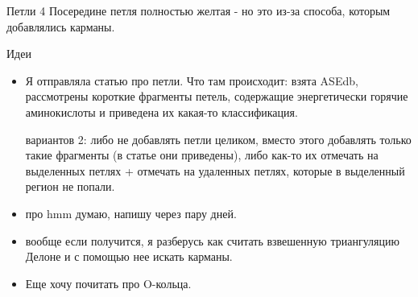 \documentclass[10pt, xcolor={dvipsnames}]{beamer}
\begin{document}
\begin{frame}{Петли 4}
Посередине петля полностью желтая - но это из-за способа, которым добавлялись карманы.
\begin{center}
\end{center}

\end{frame}

\begin{frame}{Идеи}
\begin{itemize}
\item Я отправляла статью про петли. Что там происходит: взята ASEdb, рассмотрены короткие фрагменты петель, содержащие энергетически горячие аминокислоты и приведена их какая-то классификация.

вариантов 2: либо не добавлять петли целиком, вместо этого добавлять только такие фрагменты (в статье они приведены), либо как-то их отмечать на выделенных петлях + отмечать на удаленных петлях, которые в выделенный регион не попали.

\item про hmm думаю, напишу через пару дней.

\item вообще если получится, я разберусь как считать взвешенную триангуляцию Делоне и с помощью нее искать карманы.

\item Еще хочу почитать про O-кольца.

\end{itemize}
\end{frame}
\end{document}
